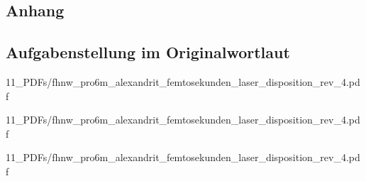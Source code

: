\begin{appendix} %
\section{Anhang}
\subsection{Aufgabenstellung im Originalwortlaut}

{11_PDFs/fhnw_pro6m_alexandrit_femtosekunden_laser_disposition_rev_4.pdf}


{11_PDFs/fhnw_pro6m_alexandrit_femtosekunden_laser_disposition_rev_4.pdf}


{11_PDFs/fhnw_pro6m_alexandrit_femtosekunden_laser_disposition_rev_4.pdf}


\end{appendix}
